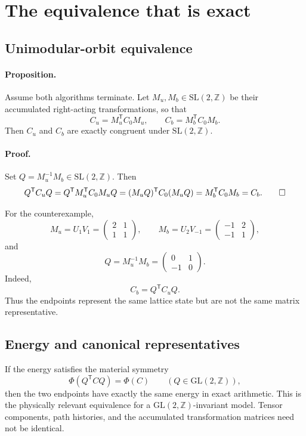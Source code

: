 \documentclass[11pt]{article}
\newcommand{\SLZ}{\mathrm{SL}(2,\mathbb{Z})}
\newcommand{\GLZ}{\mathrm{GL}(2,\mathbb{Z})}
\newcommand{\trans}{\mathsf{T}}
\begin{document}
\section{The equivalence that is exact}

\subsection{Unimodular-orbit equivalence}

\paragraph{Proposition.}
Assume both algorithms terminate.  Let $M_u,M_b\in\SLZ$ be their accumulated
right-acting transformations, so that
\[
 C_u=M_u^\trans C_0M_u,\qquad
 C_b=M_b^\trans C_0M_b.
\]
Then $C_u$ and $C_b$ are exactly congruent under $\SLZ$.

\paragraph{Proof.}
Set $Q=M_u^{-1}M_b\in\SLZ$.  Then
\[
 Q^\trans C_uQ
 =Q^\trans M_u^\trans C_0M_uQ
 =(M_uQ)^\trans C_0(M_uQ)
 =M_b^\trans C_0M_b
 =C_b.
 \qed
\]

For the counterexample,
\[
 M_u=U_1V_1=
 \begin{pmatrix}2&1\\1&1\end{pmatrix},
 \qquad
 M_b=U_2V_{-1}=
 \begin{pmatrix}-1&2\\-1&1\end{pmatrix},
\]
and
\[
 Q=M_u^{-1}M_b=
 \begin{pmatrix}0&1\\-1&0\end{pmatrix}.
\]
Indeed,
\[
 C_b=Q^\trans C_uQ.
\]
Thus the endpoints represent the same lattice state but are not the same
matrix representative.

\subsection{Energy and canonical representatives}

If the energy satisfies the material symmetry
\[
 \Phi(Q^\trans CQ)=\Phi(C)\qquad(Q\in\GLZ),
\]
then the two endpoints have exactly the same energy in exact arithmetic.
This is the physically relevant equivalence for a $\GLZ$-invariant model.
Tensor components, path histories, and the accumulated transformation matrices
need not be identical.
\end{document}
